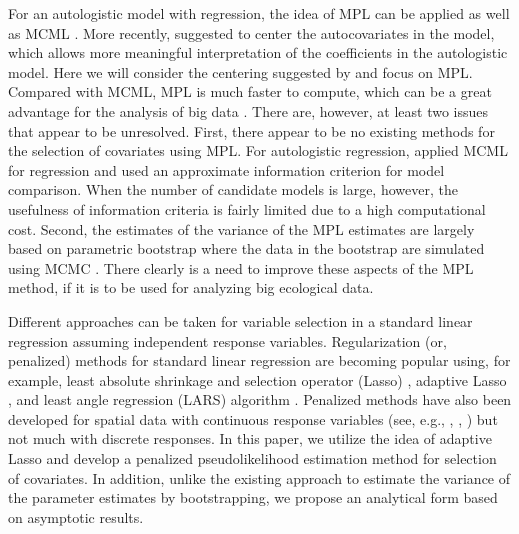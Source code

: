 \documentclass[authoryear,review, 12pt]{elsarticle}
\begin{document}
For an autologistic model with regression, the idea of MPL can be applied \citep{gumpertzg97} as well as MCML \citep{hufferw98}.  More recently, \cite{carageak09} suggested to center the autocovariates in the model, which allows more meaningful interpretation of the coefficients in the autologistic model.  Here we will consider the centering suggested by \cite{carageak09} and focus on MPL.  Compared with MCML, MPL is much faster to compute, which can be a great advantage for the analysis of big data \citep{hughesh11, wangz12, zhengz08}.  There are, however, at least two issues that appear to be unresolved.  First, there appear to be no existing methods for the selection of covariates using MPL. For autologistic regression, \cite{zhuz08} applied MCML for regression and used an approximate information criterion for model comparison.  When the number of candidate models is large, however, the usefulness of information criteria is fairly limited due to a high computational cost.  Second, the estimates of the variance of the MPL estimates are largely based on parametric bootstrap where the data in the bootstrap are simulated using MCMC \citep{gumpertzg97, zhuh05}.  There clearly is a need to improve these aspects of the MPL method, if it is to be used for analyzing big ecological data. 


Different approaches can be taken for variable selection in a standard linear regression assuming independent response variables.  Regularization (or, penalized) methods for standard linear regression are becoming popular using, for example, least absolute shrinkage and selection operator (Lasso) \citep{tibshirani96}, adaptive Lasso \citep{zou06}, and least angle regression (LARS) algorithm \citep{efronh04}.  Penalized methods have also been developed for spatial data with continuous response variables (see, e.g., \cite{huangh10}, \cite{zhul09}, \cite{zhuh10}) but not much with discrete responses.  In this paper, we utilize the idea of adaptive Lasso and develop a penalized pseudolikelihood estimation method for selection of covariates.  In addition, unlike the existing approach to estimate the variance of the parameter estimates by bootstrapping, we propose an analytical form based on asymptotic results.  
\end{document}
